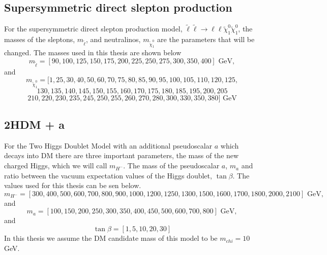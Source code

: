 \documentclass[12pt, a4paper]{book}
\begin{document}
\subsection{Supersymmetric direct slepton production}
For the supersymmetric direct slepton production model, $\tilde{\ell}\tilde{\ell}\rightarrow \ell\ell\tilde{\chi}_1^0\tilde{\chi}_1^0$, the masses of the sleptons, $m_{\tilde{\ell}}$, and neutralinos, $m_{\tilde{\chi}_1^0}$ are the parameters that will be changed. 
The masses used in this thesis are shown below 
$$
m_{\tilde{\ell}} = [90, 100, 125, 150, 175, 200, 225, 250, 275, 300, 350, 400]\text{ GeV},
$$
and
$$
m_{\tilde{\chi}_1^0} = [1, 25, 30, 40, 50, 60, 70, 75, 80, 85, 90, 95, 100, 105, 110, 120, 125,
$$
$$
130, 135, 140, 145, 150, 155,
160, 170, 175, 180, 185, 195, 200, 205
$$
$$
210, 220, 230, 235,
 245, 250, 255, 260, 270, 280, 300, 330, 350, 380 ]\text{ GeV}
$$
\subsection{2HDM + a}
For the Two Higgs Doublet Model with an additional pseudoscalar $a$ which decays into DM there are three important parameters, the mass of the new charged Higgs, which we will call $m_{H^-}$. The mass of the pseudoscalar $a$, $m_a$ and ratio between the vacuum expectation values of the Higgs doublet, $\tan\beta$. The values used for this thesis can be sen below.
$$
m_{H^-} = [300, 400, 500, 600, 700, 800, 900, 1000, 1200, 1250, 1300, 1500, 1600, 1700, 1800, 2000, 2100]\text{ GeV},
$$
and 
$$
m_a = [100, 150, 200, 250, 300, 350, 400, 450, 500, 600, 700, 800]\text{ GeV},
$$
and 
$$
\tan\beta = [1, 5, 10, 20, 30]
$$
In this thesis we assume the DM candidate mass of this model to be $m_{chi}=10$ GeV. 
\end{document}
